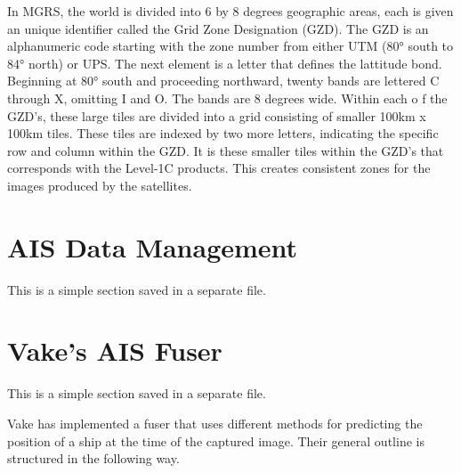 In MGRS, the world is divided into 6 by 8 degrees geographic areas, each is given an unique identifier called the Grid Zone Designation (GZD). \cite{NationalGeospatial-IntelligenceAgency2014} The GZD is an alphanumeric code starting with the zone number from either UTM (80° south to 84° north) or UPS. The next element is a letter that defines the lattitude bond. Beginning at 80° south and proceeding northward, twenty bands are lettered C through X, omitting I and O. The bands are 8 degrees wide. Within each o f the GZD's, these large tiles are divided into a grid consisting of smaller 100km x 100km tiles. These tiles are indexed by two more letters, indicating the specific row and column within the GZD. It is these smaller tiles within the GZD's that corresponds with the Level-1C products. This creates consistent zones for the images produced by the satellites.



\section{AIS Data Management}
\begin{info}{}
	This is a simple section saved in a separate file.
\end{info}

\section{Vake's AIS Fuser}
\begin{info}{}
	This is a simple section saved in a separate file.
\end{info}
Vake has implemented a fuser that uses different methods for predicting the position of a ship at the time of the captured image. Their general outline is structured in the following way. 


